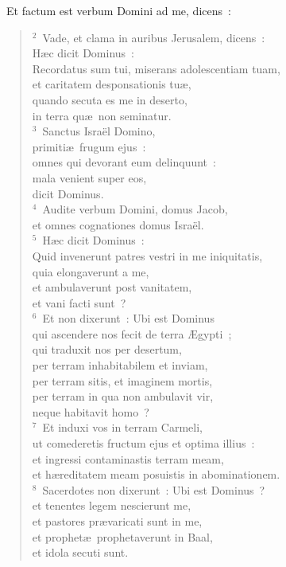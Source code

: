 ~\lettrine[lines=10,image=true,loversize=0.05,lraise=-0.03]{E}{}t factum est verbum Domini ad me, dicens~:
\begin{flushleft}\begin{verse}\vspace{6pt}${}^{2}$~Vade, et clama in auribus Jerusalem, dicens~:\\ H\ae c dicit Dominus~:\\ Recordatus sum tui, miserans adolescentiam tuam,\\ et caritatem desponsationis tu\ae ,\\ quando secuta es me in deserto,\\ in terra qu\ae\ non seminatur.\\
${}^{3}$~Sanctus Isra\"el Domino,\\ primiti\ae\ frugum ejus~:\\ omnes qui devorant eum delinquunt~:\\ mala venient super eos,\\ dicit Dominus.\\
${}^{4}$~Audite verbum Domini, domus Jacob,\\ et omnes cognationes domus Isra\"el.\\
${}^{5}$~H\ae c dicit Dominus~:\\ Quid invenerunt patres vestri in me iniquitatis,\\ quia elongaverunt a me,\\ et ambulaverunt post vanitatem,\\ et vani facti sunt~?\\
${}^{6}$~Et non dixerunt~: Ubi est Dominus\\ qui ascendere nos fecit de terra \AE gypti~;\\ qui traduxit nos per desertum,\\ per terram inhabitabilem et inviam,\\ per terram sitis, et imaginem mortis,\\ per terram in qua non ambulavit vir,\\ neque habitavit homo~?\\
${}^{7}$~Et induxi vos in terram Carmeli,\\ ut comederetis fructum ejus et optima illius~:\\ et ingressi contaminastis terram meam,\\ et h\ae reditatem meam posuistis in abominationem.\\
${}^{8}$~Sacerdotes non dixerunt~: Ubi est Dominus~?\\ et tenentes legem nescierunt me,\\ et pastores pr\ae varicati sunt in me,\\ et prophet\ae\ prophetaverunt in Baal,\\ et idola secuti sunt.\\

\end{verse}
\end{flushleft}
